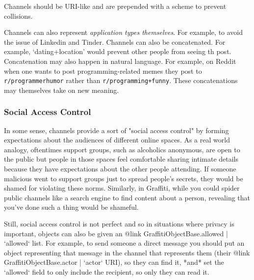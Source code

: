 Channels should be URI-like and are prepended with a scheme to prevent
collisions.

Channels can also represent \emph{application types themselves}.
For example, to avoid the issue of Linkedin and Tinder.
Channels can also be concatenated.
For example, `dating+location' would prevent other people from seeing th post.
Concatenation may also happen in natural language.
For example, on Reddit when one wants to post programming-related memes they post to \texttt{r/programmerhumor} rather than \texttt{r/programming+funny}.
These concatenations may themselves take on new meaning.



\subsubsection{Social Access Control}

In some sense, channels provide a sort of "social access control" by forming
expectations about the audiences of different online spaces.
As a real world analogy, oftentimes support groups, such as alcoholics
anonymous, are open to the public but people in those spaces feel comfortable sharing intimate details
because they have expectations about the other people attending.
If someone malicious went to support groups just to spread people's secrets,
they would be shamed for violating these norms.
Similarly, in Graffiti, while you could spider public channels like a search engine
to find content about a person, revealing that you've done such a thing
would be shameful.

Still, social access control is not perfect and so in situations where privacy is important,
objects can also be given
an {@link GraffitiObjectBase.allowed | `allowed`} list.
For example, to send someone a direct message you should put an object representing
that message in the channel that represents them (their {@link GraffitiObjectBase.actor | `actor` URI}),
so they can find it, *and* set the `allowed` field to only include the recipient,
so only they can read it.

